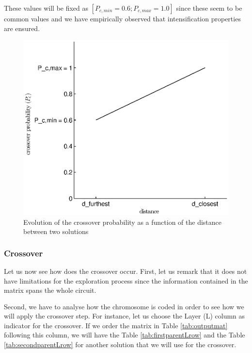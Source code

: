 These values will be fixed as $[P_{c, min} = 0.6; P_{c, max} = 1.0]$ since these seem to be common values \cite{Davis1989} and we have empirically observed that intensification properties are ensured.

\begin{figure}[h!]
\begin{center}
\includegraphics[width=\textwidth]{crossover_proba.eps}
\end{center}
\vspace{-0.5cm}
\caption{Evolution of the crossover probability as a function of the distance between two solutions}
\begin{center}
\end{center}
\label{fig:cross_proba}
\end{figure}

\subsubsection{Crossover}

Let us now see how does the crossover occur. First, let us remark that it does not have limitations for the exploration process since the information contained in the matrix spans the whole circuit.

Second, we have to analyse how the chromosome is coded in order to see how we will apply the crossover step. For instance, let us choose the Layer (L) column as indicator for the crossover. If we order the matrix in Table \ref{tab:outputmat} following this column, we will have the Table \ref{tab:firstparentLrow} and the Table \ref{tab:secondparentLrow} for another solution that we will use for the crossover.

